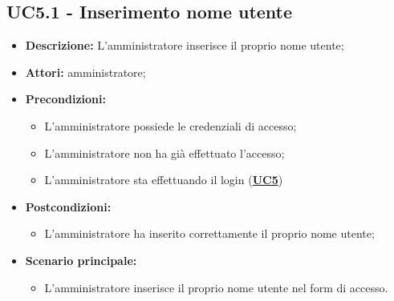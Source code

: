 \documentclass[5pt]{article}
\begin{document}
\subsection{UC5.1 - Inserimento nome utente}
\label{sec:UC5.1}
\begin{itemize}
    \item \textbf{Descrizione:} L’amministratore inserisce il proprio nome utente;
    \item \textbf{Attori:} amministratore;
    \item \textbf{Precondizioni:} 
    \begin{itemize}
        \item L’amministratore possiede le credenziali di accesso;
        \item L’amministratore non ha già effettuato l’accesso;
        \item L’amministratore sta effettuando il login (\hyperref[sec:UC5]{\textbf{UC5}})
    \end{itemize}
    \item \textbf{Postcondizioni:} 
    \begin{itemize}
        \item L’amministratore ha inserito correttamente il proprio nome utente;
    \end{itemize}
    \item \textbf{Scenario principale:} 
    \begin{itemize}
        \item L’amministratore inserisce il proprio nome utente nel form di accesso.
    \end{itemize}
\end{itemize}
\end{document}

